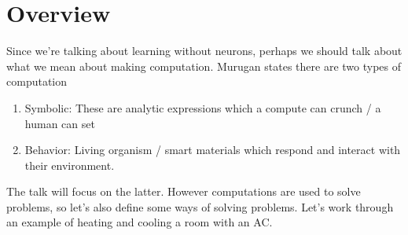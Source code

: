 \section{Overview}
Since we're talking about learning without neurons, perhaps we should talk about what we mean about making computation. Murugan states there are two types of computation
\begin{enumerate}
	\item Symbolic: These are analytic expressions which a compute can crunch / a human can set 
	\item Behavior: Living organism / smart materials which respond and interact with their environment.
\end{enumerate}
The talk will focus on the latter. However computations are used to solve problems, so let's also define some ways of solving problems. Let's work through an example of heating and cooling a room with an AC. 
